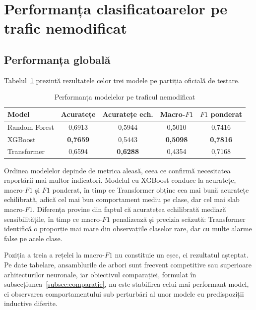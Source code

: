 \section{Performanța clasificatoarelor pe trafic nemodificat}\label{sec:rezultate-o1}

\subsection{Performanța globală}\label{subsec:global}

Tabelul~\ref{tab:metrici} prezintă rezultatele celor trei modele pe partiția oficială de testare.

\begin{table}[!ht]
    \caption{Performanța modelelor pe traficul nemodificat}
    \centering
    \begin{tabular}{|l|c|c|c|c|}
        \hline
        \textbf{Model} & \textbf{Acuratețe} & \textbf{Acuratețe ech.} & \textbf{Macro-$F1$} & \textbf{$F1$ ponderat} \\
        \hline
        Random Forest & 0,6913 & 0,5944 & 0,5010 & 0,7416 \\
        \hline
        XGBoost & \textbf{0,7659} & 0,5443 & \textbf{0,5098} & \textbf{0,7816} \\
        \hline
        Transformer & 0,6594 & \textbf{0,6288} & 0,4354 & 0,7168 \\
        \hline
    \end{tabular}
    \label{tab:metrici}
\end{table}

Ordinea modelelor depinde de metrica aleasă, ceea ce confirmă necesitatea raportării mai multor indicatori. Modelul cu XGBoost conduce la acuratețe, macro-$F1$ și $F1$ ponderat, în timp ce Transformer obține cea mai bună acuratețe echilibrată, adică cel mai bun comportament mediu pe clase, dar cel mai slab macro-$F1$. Diferența provine din faptul că acuratețea echilibrată mediază sensibilitățile, în timp ce macro-$F1$ penalizează și precizia scăzută: Transformer identifică o proporție mai mare din observațiile claselor rare, dar cu multe alarme false pe acele clase.

Poziția a treia a rețelei la macro-$F1$ nu constituie un eșec, ci rezultatul așteptat. Pe date tabelare, ansamblurile de arbori sunt frecvent competitive sau superioare arhitecturilor neuronale, iar obiectivul comparației, formulat în subsecțiunea~\ref{subsec:comparatie}, nu este stabilirea celui mai performant model, ci observarea comportamentului sub perturbări al unor modele cu predispoziții inductive diferite.

